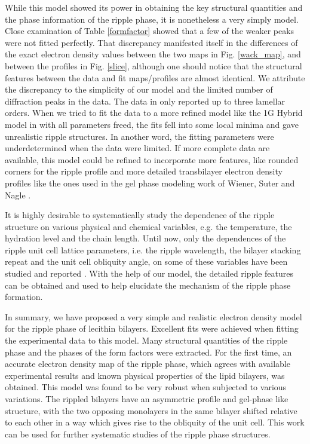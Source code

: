 While this model showed its power in obtaining the key structural quantities
and the phase information of the ripple phase, it is nonetheless a very
simply model. Close examination of Table \ref{formfactor} showed that
a few of the weaker peaks were not fitted perfectly. That discrepancy
manifested itself in the differences of the exact electron density values
between the two maps in Fig. \ref{wack_map}, and between the profiles in 
Fig. \ref{slice}, although one should notice that the structural features
between the data and fit maps/profiles are almost identical. We attribute
the discrepancy to the simplicity of our model and the limited number of
diffraction peaks in the data. The data in \cite{Wac89a} only reported
up to three lamellar orders. When we tried to fit the data to a more 
refined model like the 1G Hybrid model in \cite{WSN89} with all parameters
freed, the fits fell into some local minima and gave unrealistic ripple
structures. In another word, the fitting parameters were underdetermined 
when the data were limited. If more complete data are available, this model 
could be refined to incorporate more features, like rounded corners for the 
ripple profile and more detailed transbilayer electron density profiles like 
the ones used in the gel phase modeling work of Wiener, Suter and Nagle 
\cite{WSN89}.

It is highly desirable to systematically study the dependence of
the ripple structure on various physical and chemical variables,
e.g. the temperature, the hydration level and the chain length.
Until now, only the dependences of the ripple unit cell
lattice parameters, i.e. the ripple wavelength, the bilayer stacking
repeat and the unit cell obliquity angle, on some of these variables
have been  studied and reported \cite{Wac89a,Matu90,Cev91}. With the help
of our model, the detailed ripple features can be obtained and used
to help elucidate the mechanism of the ripple phase formation. 

In summary, we have proposed a very simple and realistic electron density 
model for the ripple phase of lecithin bilayers. Excellent fits were 
achieved when fitting the experimental data to this model. Many structural
quantities of the ripple phase and the phases of the form factors
were extracted. For the first time, an accurate electron density map of the
ripple phase, which agrees with available experimental results and known
physical properties of the lipid bilayers, was obtained. This model was found 
to be very robust when subjected to various variations. The rippled bilayers 
have an asymmetric profile and gel-phase like structure, with the two 
opposing monolayers in the same bilayer shifted relative to each other in a 
way which gives rise to the obliquity of the unit cell. This work can be 
used for further systematic studies of the ripple phase structures.

